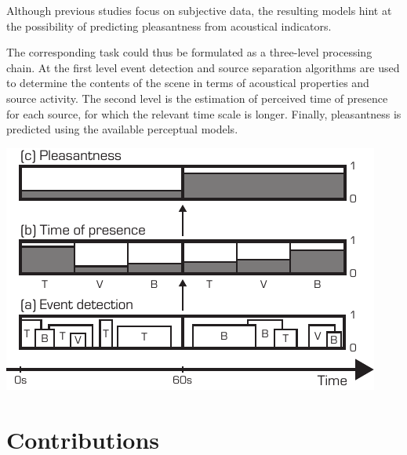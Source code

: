 \documentclass[a0,portrait]{a0poster}
\begin{document}
\begin{multicols}{2}
Although previous studies focus on subjective data, the resulting models hint at the possibility of predicting pleasantness from acoustical indicators.


\vspace{1cm}





The corresponding task could thus be formulated as a three-level processing chain. At the first level event detection and source separation algorithms are used to determine the contents of the scene in terms of acoustical properties and source activity. The second level is the estimation of perceived time of presence for each source, for which the relevant time scale is longer. Finally, pleasantness is predicted using the available perceptual models.


\begin{center}\vspace{1cm}
\includegraphics[width=0.65\linewidth]{block.pdf}
\end{center}

\color{DarkSlateGray} %



\section*{Contributions}


\end{multicols}
\end{document}
